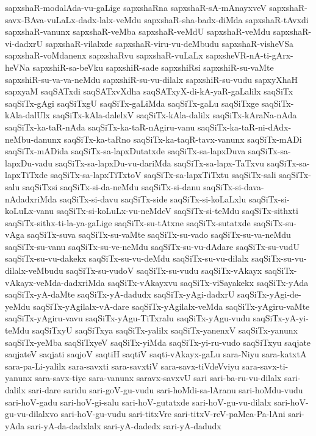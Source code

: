 {sapxshaR-modalAda-vu-gaLige
sapxshaRna
sapxshaR-sA-mAnayxveV
sapxshaR-savx-BAva-vuLaLx-dadx-lalx-veMdu
sapxshaR-sha-badx-diMda
sapxshaR-tAvxdi
sapxshaR-vanunx
sapxshaR-veMba
sapxshaR-veMdU
sapxshaR-veMdu
sapxshaR-vi-dadxrU
sapxshaR-vilalxde
sapxshaR-viru-vu-deMbudu
sapxshaR-visheVSa
sapxshaR-voMdanenx
sapxshaRvu
sapxshaR-vuLaLx
sapxsheVR-nA-ti-gArx-heVNa
sapxshiR-sa-beVku
sapxshiR-sade
sapxshiRsi
sapxshiR-su-vaMte
sapxshiR-su-va-va-neMdu
sapxshiR-su-vu-dilalx
sapxshiR-su-vudu
sapxyXhaH
sapxyaM
saqSATxdi
saqSATxvXdha
saqSATxyX-di-kA-yaR-gaLalilx
saqSiTx
saqSiTx-gAgi
saqSiTxgU
saqSiTx-gaLiMda
saqSiTx-gaLu
saqSiTxge
saqSiTx-kAla-dalUlx
saqSiTx-kAla-dalelxV
saqSiTx-kAla-dalilx
saqSiTx-kAraNa-nAda
saqSiTx-ka-taR-nAda
saqSiTx-ka-taR-nAgiru-vanu
saqSiTx-ka-taR-ni-dAdx-neMbu-danunx
saqSiTx-ka-taRno
saqSiTx-ka-taqR-tavx-vanunx
saqSiTx-mADi
saqSiTx-mADida
saqSiTx-sa-lapxDutatxde
saqSiTx-sa-lapxDuva
saqSiTx-sa-lapxDu-vadu
saqSiTx-sa-lapxDu-vu-dariMda
saqSiTx-sa-lapx-TaTxvu
saqSiTx-sa-lapxTiTxde
saqSiTx-sa-lapxTiTxtoV
saqSiTx-sa-lapxTiTxtu
saqSiTx-sali
saqSiTx-salu
saqSiTxsi
saqSiTx-si-da-neMdu
saqSiTx-si-danu
saqSiTx-si-dava-nAdadxriMda
saqSiTx-si-davu
saqSiTx-side
saqSiTx-si-koLaLxlu
saqSiTx-si-koLuLx-vanu
saqSiTx-si-koLuLx-vu-neMdeV
saqSiTx-si-teMdu
saqSiTx-sithxti
saqSiTx-sithx-ti-la-ya-gaLige
saqSiTx-su-tAtxne
saqSiTx-sutatxde
saqSiTx-su-vAga
saqSiTx-suva
saqSiTx-su-vaMte
saqSiTx-su-vado
saqSiTx-su-va-neMdu
saqSiTx-su-vanu
saqSiTx-su-ve-neMdu
saqSiTx-su-vu-dAdare
saqSiTx-su-vudU
saqSiTx-su-vu-dakekx
saqSiTx-su-vu-deMdu
saqSiTx-su-vu-dilalx
saqSiTx-su-vu-dilalx-veMbudu
saqSiTx-su-vudoV
saqSiTx-su-vudu
saqSiTx-vAkayx
saqSiTx-vAkayx-veMda-dadxriMda
saqSiTx-vAkayxvu
saqSiTx-viSayakekx
saqSiTx-yAda
saqSiTx-yA-daMte
saqSiTx-yA-dadudx
saqSiTx-yAgi-dadxrU
saqSiTx-yAgi-de-yeMdu
saqSiTx-yAgilalx-vA-dare
saqSiTx-yAgilalx-veMda
saqSiTx-yAgiru-vaMte
saqSiTx-yAgiru-vavu
saqSiTx-yAgu-TiTxralu
saqSiTx-yAgu-vudu
saqSiTx-yA-yi-teMdu
saqSiTxyU
saqSiTxya
saqSiTx-yalilx
saqSiTx-yanenxV
saqSiTx-yanunx
saqSiTx-yeMba
saqSiTxyeV
saqSiTx-yiMda
saqSiTx-yi-ru-vudo
saqSiTxyu
saqjate
saqjateV
saqjati
saqjoV
saqtiH
saqtiV
saqti-vAkayx-gaLu
sara-Niyu
sara-katxtA
sara-pa-Li-yalilx
sara-savxti
sara-savxtiV
sara-savx-tiVdeVviyu
sara-savx-ti-yanunx
sara-savx-tiye
sara-vanunx
saravx-savxvU
sari
sari-ba-ru-vu-dilalx
sari-dalilx
sari-dare
saridu
sari-goV-gu-vudu
sari-hoMdi-sa-lAranu
sari-hoMdu-vudu
sari-hoV-gadu
sari-hoV-gi-salu
sari-hoV-gutatxde
sari-hoV-gu-vu-dilalx
sari-hoV-gu-vu-dilalxvo
sari-hoV-gu-vudu
sari-titxVre
sari-titxV-reV-paMca-Pa-lAni
sari-yAda
sari-yA-da-dadxlalx
sari-yA-dadedx
sari-yA-dadudx
}
